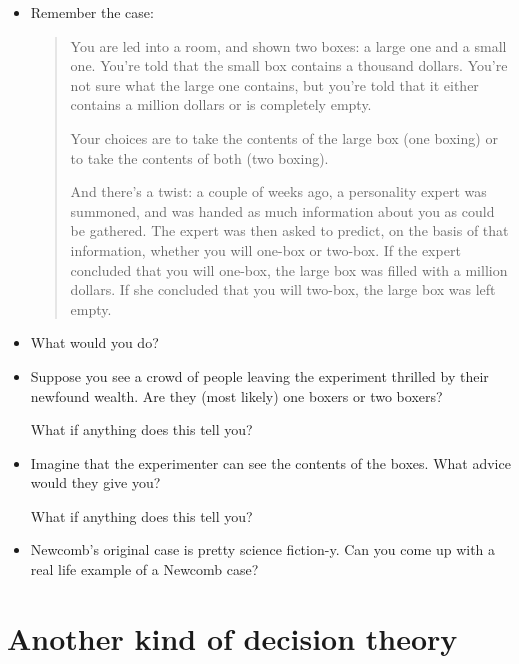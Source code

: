 \documentclass[justified]{tufte-handout}
\begin{document}
\begin{itemize}

\item Remember the case: 

\begin{quote}

You are led into a room, and shown two boxes: a large one and a small one. You're
told that the small box contains a thousand dollars. You're not sure what the large one
contains, but you're told that it either contains a million dollars or is completely empty.

Your choices are to take the contents of the large box (one boxing) or to take the contents of both (two boxing).

 And there's a twist: a couple of weeks ago, a personality expert was summoned, and was handed as much information about you as could be gathered. The expert was then asked to predict, on the
basis of that information, whether you will one-box or two-box. If the expert concluded
that you will one-box, the large box was filled with a million dollars. If she concluded that you will two-box, the large box was left empty.


\end{quote}



\item What would you do?



\item Suppose you see a crowd of people leaving the experiment thrilled by their newfound wealth. Are they (most likely) one boxers or two boxers?

What if anything does this tell you?


\item Imagine that the experimenter can see the contents of the boxes. What advice would they give you?

What if anything does this tell you?



\item Newcomb's original case is pretty science fiction-y. Can you come up with a real life example of a Newcomb case?



\end{itemize}




\section{Another kind of decision theory}
\end{document}
